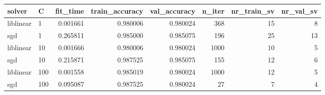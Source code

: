 \begin{tabular}{llrrrrrr}
\toprule
   solver &   C &  fit\_time &  train\_accuracy &  val\_accuracy &  n\_iter &  nr\_train\_sv &  nr\_val\_sv \\
\midrule
liblinear &   1 &  0.001661 &        0.980006 &      0.980024 &     368 &           15 &          8 \\
      sgd &   1 &  0.265811 &        0.985000 &      0.985075 &     196 &           25 &         13 \\
liblinear &  10 &  0.001666 &        0.980006 &      0.980024 &    1000 &           10 &          5 \\
      sgd &  10 &  0.215871 &        0.987525 &      0.985075 &     155 &           12 &          6 \\
liblinear & 100 &  0.001558 &        0.985019 &      0.980024 &    1000 &           12 &          5 \\
      sgd & 100 &  0.095087 &        0.987525 &      0.980024 &      27 &            7 &          4 \\
\bottomrule
\end{tabular}
